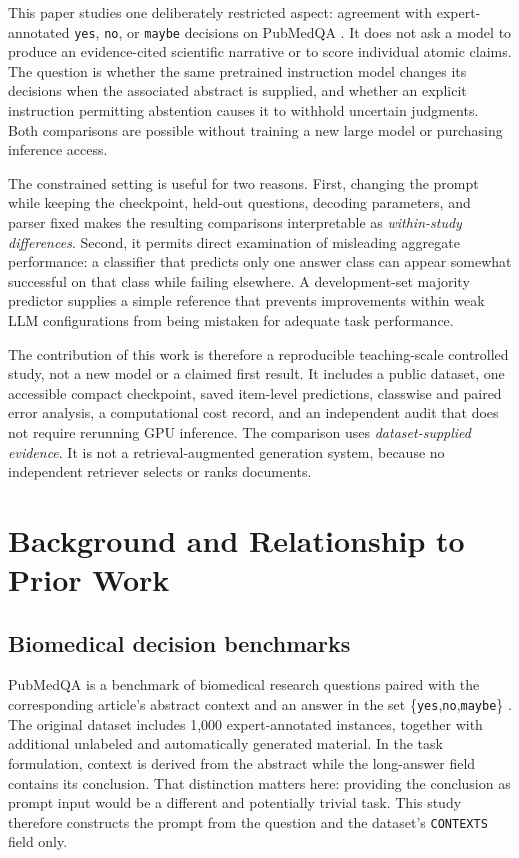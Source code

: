 \documentclass[conference]{IEEEtran}
\begin{document}
This paper studies one deliberately restricted aspect: agreement with expert-annotated \texttt{yes}, \texttt{no}, or \texttt{maybe} decisions on PubMedQA \cite{pubmedqa}. It does not ask a model to produce an evidence-cited scientific narrative or to score individual atomic claims. The question is whether the same pretrained instruction model changes its decisions when the associated abstract is supplied, and whether an explicit instruction permitting abstention causes it to withhold uncertain judgments. Both comparisons are possible without training a new large model or purchasing inference access.

The constrained setting is useful for two reasons. First, changing the prompt while keeping the checkpoint, held-out questions, decoding parameters, and parser fixed makes the resulting comparisons interpretable as \emph{within-study differences}. Second, it permits direct examination of misleading aggregate performance: a classifier that predicts only one answer class can appear somewhat successful on that class while failing elsewhere. A development-set majority predictor supplies a simple reference that prevents improvements within weak LLM configurations from being mistaken for adequate task performance.

The contribution of this work is therefore a reproducible teaching-scale controlled study, not a new model or a claimed first result. It includes a public dataset, one accessible compact checkpoint, saved item-level predictions, classwise and paired error analysis, a computational cost record, and an independent audit that does not require rerunning GPU inference. The comparison uses \emph{dataset-supplied evidence}. It is not a retrieval-augmented generation system, because no independent retriever selects or ranks documents.

\section{Background and Relationship to Prior Work}
\subsection{Biomedical decision benchmarks}
PubMedQA is a benchmark of biomedical research questions paired with the corresponding article's abstract context and an answer in the set \{\texttt{yes},\texttt{no},\texttt{maybe}\} \cite{pubmedqa}. The original dataset includes 1,000 expert-annotated instances, together with additional unlabeled and automatically generated material. In the task formulation, context is derived from the abstract while the long-answer field contains its conclusion. That distinction matters here: providing the conclusion as prompt input would be a different and potentially trivial task. This study therefore constructs the prompt from the question and the dataset's \texttt{CONTEXTS} field only.
\end{document}
